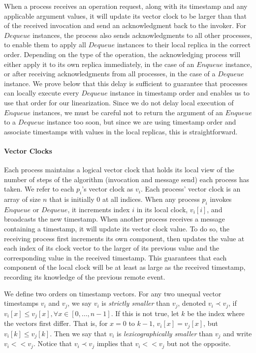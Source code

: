 \documentclass[a4paper,anonymous,USenglish]{lipics-v2021}
\theoremstyle{definition}
\begin{document}
When a process receives an operation request, along with its timestamp and any applicable argument values, it will update its vector clock to be larger than that of the received invocation and send an acknowledgment back to the invoker.  For $Dequeue$ instances, the process also sends acknowledgments to all other processes, to enable them to apply all $Dequeue$ instances to their local replica in the correct order.  Depending on the type of the operation, the acknowledging process will either apply it to its own replica immediately, in the case of an $Enqueue$ instance, or after receiving acknowledgments from all processes, in the case of a $Dequeue$ instance.  We prove below that this delay is sufficient to guarantee that processes can locally execute every $Dequeue$ instance in timestamp order and enables us to use that order for our linearization.  Since we do not delay local execution of $Enqueue$ instances, we must be careful not to return the argument of an $Enqueue$ to a $Dequeue$ instance too soon, but since we are using timestamp order and associate timestamps with values in the local replicas, this is straightforward.

\paragraph*{Vector Clocks}  Each process maintains a logical vector clock that holds its local view of the number of steps of the algorithm (invocation and message send) each process has taken.  We refer to each $p_i$'s vector clock as $v_i$.  Each process' vector clock is an array of size $n$ that is initially 0 at all indices.  When any process $p_i$ invokes $Enqueue$ or $Dequeue$, it increments index $i$ in its local clock, $v_i[i]$, and broadcasts the new timestamp.  When another process receives a message containing a timestamp, it will update its vector clock value.  To do so, the receiving process first increments its own component, then updates the value at each index of its clock vector to the larger of its previous value and the corresponding value in the received timestamp.  This guarantees that each component of the local clock will be at least as large as the received timestamp, recording its knowledge of the previous remote event.

We define two orders on timestamp vectors.  For any two unequal vector timestamps $v_i$ and $v_j$, we say $v_i$ is \emph{strictly smaller} than $v_j$, denoted $v_i \prec  v_j$, if $v_i[x] \leq v_j[x],\forall x \in [0, \dots, n-1]$.  If this is not true, let $k$ be the index where the vectors first differ.  That is, for $x = 0$ to $k-1$, $v_i[x] = v_j[x]$, but $v_i[k] \leq v_j [k]$.  Then we say that $v_i$ is \emph{lexicographically smaller} than $v_j$ and write $v_i << v_j$.  Notice that $v_i \prec v_j$ implies that $v_i << v_j$ but not the opposite.
\end{document}
